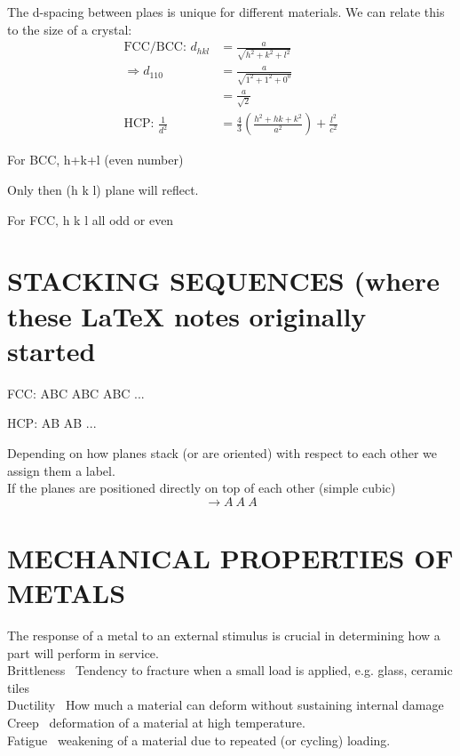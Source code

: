 \documentclass{article}
\begin{document}
The d-spacing between plaes is unique for different materials. We can relate this to the size of a crystal:
\begin{align*}
    \text{FCC/BCC: } d_{hkl} &= \frac{a}{\sqrt{h^2+k^2+l^2}}\\
    \Rightarrow d_{1 1 0} &= \frac{a}{\sqrt{1^2+1^2+0^0}}\\
    &= \frac{a}{\sqrt{2}}\\
    \text{HCP: } \frac{1}{d^2} &= \frac{4}{3}\left(\frac{h^2+hk+k^2}{a^2}\right)+\frac{l^2}{c^2}
\end{align*}

For BCC, h+k+l (even number)

Only then (h k l) plane will reflect.

For FCC, h k l all odd or even


\section{STACKING SEQUENCES (where these LaTeX notes originally started}
FCC: ABC ABC ABC ...

HCP: AB AB ...

Depending on how planes stack (or are oriented) with respect to each other we assign them a label.\\
If the planes are positioned directly on top of each other (simple cubic)\\
\[\rightarrow A\ A\ A\]

\section{MECHANICAL PROPERTIES OF METALS}
The response of a metal to an external stimulus is crucial in determining how a part will perform in service.\\ 
Brittleness \textrightarrow\ Tendency to fracture when a small load is applied, e.g. glass, ceramic tiles\\

Ductility \textrightarrow\ How much a material can deform without sustaining internal damage\\

Creep \textrightarrow\ deformation of a material at high temperature.\\

Fatigue \textrightarrow\ weakening of a material due to repeated (or cycling) loading.\\
\end{document}

